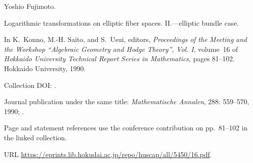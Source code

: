 Yoshio Fujimoto.

\newblock Logarithmic transformations on elliptic fiber spaces. II.---elliptic bundle case.

\newblock In K.~Konno, M.-H. Saito, and S.~Usui, editors, \emph{Proceedings of
  the Meeting and the Workshop ``Algebraic Geometry and Hodge Theory'', Vol.
  I}, volume~16 of \emph{Hokkaido University Technical Report Series in
  Mathematics}, pages 81--102. Hokkaido University, 1990.

\newblock Collection DOI: .

\newblock Journal publication under the same title: \emph{Mathematische
  Annalen}, 288: 559--570, 1990; .

\newblock Page and statement references use the conference contribution
  on pp.~81--102 in the linked collection.

\newblock URL
  \url{https://eprints.lib.hokudai.ac.jp/repo/huscap/all/5450/16.pdf}.
